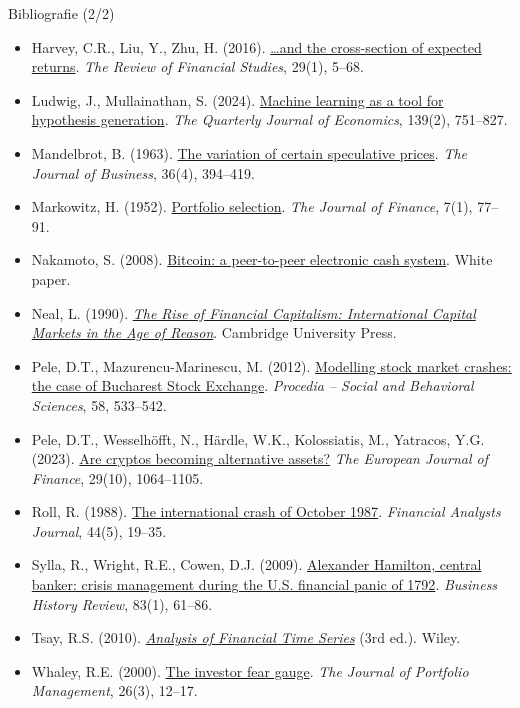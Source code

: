 \begin{frame}{Bibliografie (2/2)}
\itemsize{\tiny}
\begin{itemize}
    \item Harvey, C.R., Liu, Y., Zhu, H. (2016). \href{https://doi.org/10.1093/rfs/hhv059}{\ldots and the cross-section of expected returns}. \emph{The Review of Financial Studies}, 29(1), 5--68.
    \item Ludwig, J., Mullainathan, S. (2024). \href{https://doi.org/10.1093/qje/qjad055}{Machine learning as a tool for hypothesis generation}. \emph{The Quarterly Journal of Economics}, 139(2), 751--827.
    \item Mandelbrot, B. (1963). \href{https://doi.org/10.1086/294632}{The variation of certain speculative prices}. \emph{The Journal of Business}, 36(4), 394--419.
    \item Markowitz, H. (1952). \href{https://doi.org/10.1111/j.1540-6261.1952.tb01525.x}{Portfolio selection}. \emph{The Journal of Finance}, 7(1), 77--91.
    \item Nakamoto, S. (2008). \href{https://bitcoin.org/bitcoin.pdf}{Bitcoin: a peer-to-peer electronic cash system}. White paper.
    \item Neal, L. (1990). \href{https://doi.org/10.1017/CBO9780511665127}{\emph{The Rise of Financial Capitalism: International Capital Markets in the Age of Reason}}. Cambridge University Press.
    \item Pele, D.T., Mazurencu-Marinescu, M. (2012). \href{https://doi.org/10.1016/j.sbspro.2012.09.1030}{Modelling stock market crashes: the case of Bucharest Stock Exchange}. \emph{Procedia -- Social and Behavioral Sciences}, 58, 533--542.
    \item Pele, D.T., Wesselhöfft, N., Härdle, W.K., Kolossiatis, M., Yatracos, Y.G. (2023). \href{https://doi.org/10.1080/1351847X.2021.1960403}{Are cryptos becoming alternative assets?} \emph{The European Journal of Finance}, 29(10), 1064--1105.
    \item Roll, R. (1988). \href{https://doi.org/10.2469/faj.v44.n5.19}{The international crash of October 1987}. \emph{Financial Analysts Journal}, 44(5), 19--35.
    \item Sylla, R., Wright, R.E., Cowen, D.J. (2009). \href{https://doi.org/10.1017/S0007680500000209}{Alexander Hamilton, central banker: crisis management during the U.S. financial panic of 1792}. \emph{Business History Review}, 83(1), 61--86.
    \item Tsay, R.S. (2010). \href{https://doi.org/10.1002/9780470644560}{\emph{Analysis of Financial Time Series}} (3rd ed.). Wiley.
    \item Whaley, R.E. (2000). \href{https://doi.org/10.3905/jpm.2000.319728}{The investor fear gauge}. \emph{The Journal of Portfolio Management}, 26(3), 12--17.
\end{itemize}
\end{frame}



